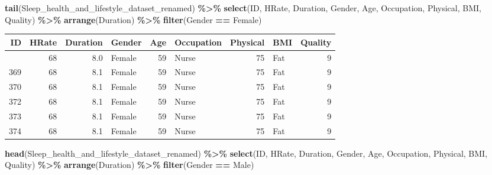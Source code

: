 \documentclass[
  11pt,
]{article}
\newenvironment{Shaded}{\begin{snugshade}}{\end{snugshade}}
\newcommand{\FunctionTok}[1]{\textcolor[rgb]{0.13,0.29,0.53}{\textbf{#1}}}
\newcommand{\NormalTok}[1]{#1}
\newcommand{\SpecialCharTok}[1]{\textcolor[rgb]{0.81,0.36,0.00}{\textbf{#1}}}
\newcommand{\StringTok}[1]{\textcolor[rgb]{0.31,0.60,0.02}{#1}}
\begin{document}
\begin{Shaded}
\begin{Highlighting}[]
\FunctionTok{tail}\NormalTok{(Sleep\_health\_and\_lifestyle\_dataset\_renamed) }\SpecialCharTok{\%\textgreater{}\%}
 \FunctionTok{select}\NormalTok{(ID, HRate, Duration, Gender, Age, Occupation, Physical, BMI, Quality) }\SpecialCharTok{\%\textgreater{}\%}
  \FunctionTok{arrange}\NormalTok{(Duration) }\SpecialCharTok{\%\textgreater{}\%}
  \FunctionTok{filter}\NormalTok{(Gender }\SpecialCharTok{==} \StringTok{\textquotesingle{}Female\textquotesingle{}}\NormalTok{)}
\end{Highlighting}
\end{Shaded}

\begin{longtable}[]{@{}rrrlrlrlr@{}}
\toprule\noalign{}
ID & HRate & Duration & Gender & Age & Occupation & Physical & BMI &
Quality \\
\midrule\noalign{}
\endhead
\bottomrule\noalign{}
\endlastfoot
371 & 68 & 8.0 & Female & 59 & Nurse & 75 & Fat & 9 \\
369 & 68 & 8.1 & Female & 59 & Nurse & 75 & Fat & 9 \\
370 & 68 & 8.1 & Female & 59 & Nurse & 75 & Fat & 9 \\
372 & 68 & 8.1 & Female & 59 & Nurse & 75 & Fat & 9 \\
373 & 68 & 8.1 & Female & 59 & Nurse & 75 & Fat & 9 \\
374 & 68 & 8.1 & Female & 59 & Nurse & 75 & Fat & 9 \\
\end{longtable}

\begin{Shaded}
\begin{Highlighting}[]
\FunctionTok{head}\NormalTok{(Sleep\_health\_and\_lifestyle\_dataset\_renamed) }\SpecialCharTok{\%\textgreater{}\%}
 \FunctionTok{select}\NormalTok{(ID, HRate, Duration, Gender, Age, Occupation, Physical, BMI, Quality) }\SpecialCharTok{\%\textgreater{}\%}
  \FunctionTok{arrange}\NormalTok{(Duration) }\SpecialCharTok{\%\textgreater{}\%}
  \FunctionTok{filter}\NormalTok{(Gender }\SpecialCharTok{==} \StringTok{\textquotesingle{}Male\textquotesingle{}}\NormalTok{)}
\end{Highlighting}
\end{Shaded}
\end{document}
